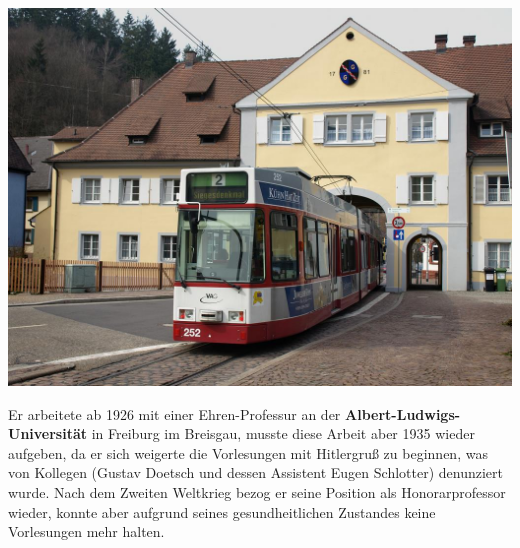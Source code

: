 \documentclass[landscape, a4paper]{article}
\newcommand\alert[1]{\textcolor{PrimaryColor}{\textbf{#1}}}
\begin{document}
\begin{minipage}[t]{0.32\textwidth}
	\includegraphics[width=\linewidth]{./figures/tor.png}
	\setlength{\parskip}{0.25cm}
	\vspace{0.15cm}

	Er arbeitete ab 1926 mit einer Ehren-Professur an der \alert{Albert-Ludwigs-Universität} in Freiburg im Breisgau, musste diese Arbeit aber 1935 wieder aufgeben, da er sich weigerte die Vorlesungen mit Hitlergruß zu beginnen, was von Kollegen (Gustav Doetsch und dessen Assistent Eugen Schlotter) denunziert wurde. Nach dem Zweiten Weltkrieg bezog er seine Position als Honorarprofessor wieder, konnte aber aufgrund seines gesundheitlichen Zustandes keine Vorlesungen mehr halten.
\end{minipage}
\newpage
\end{document}
